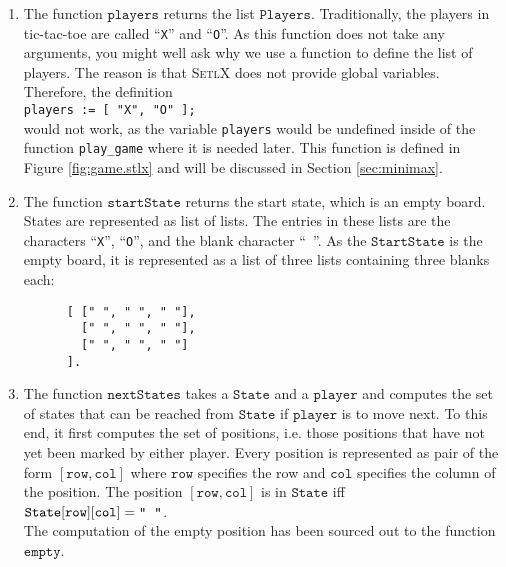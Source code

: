 \begin{enumerate}
\item The function $\texttt{players}$ returns the list $\texttt{Players}$.  Traditionally, the players in
      tic-tac-toe are called ``\texttt{X}'' and ``\texttt{O}''.  As this function does not take any arguments, 
      you might well ask why we use a function to define the list of players.  The reason is that
      \textsc{SetlX} does  not provide global variables.  Therefore, the definition
      \\[0.2cm]
      \hspace*{1.3cm}
      \texttt{players := [ "X", "O" ];}
      \\[0.2cm]
      would not work, as the variable \texttt{players} would be undefined inside of the function
      \texttt{play\_game} where it is needed later.   This function is defined in Figure \ref{fig:game.stlx}
      and will be discussed in Section \ref{sec:minimax}.
\item The function $\texttt{startState}$ returns the start state, which is an empty board.
      States are represented as list of lists.  The entries in these lists are the characters 
      ``\texttt{X}'', ``\texttt{O}'', and the blank character ``\texttt{ }''.
      As the  $\texttt{StartState}$ is the empty board, it is represented as a list of three lists
      containing three blanks each:
      \begin{Verbatim}
      [ [" ", " ", " "], 
        [" ", " ", " "], 
        [" ", " ", " "]
      ].     
      \end{Verbatim}
\item The function $\texttt{nextStates}$ takes a $\texttt{State}$ and a $\texttt{player}$ and computes the set
      of states that can be reached from $\texttt{State}$ if $\texttt{player}$ is to move next.
      To this end, it first computes the set of  positions, i.e. those positions that have not yet
      been marked by either player. Every position is represented as pair of the
      form $[\texttt{row}, \texttt{col}]$ where $\texttt{row}$ specifies the row and $\texttt{col}$ specifies
      the column of the position.  The position $[\texttt{row}, \texttt{col}]$ is  in
      $\texttt{State}$ iff
      \\[0.2cm]
      \hspace*{1.3cm}
      $\texttt{State}[\texttt{row}][\texttt{col}] = \texttt{\symbol{34}\;\;\symbol{34}}$.
      \\[0.2cm]
      The computation of the empty position has been sourced out to the function $\texttt{empty}$.

\end{enumerate}
